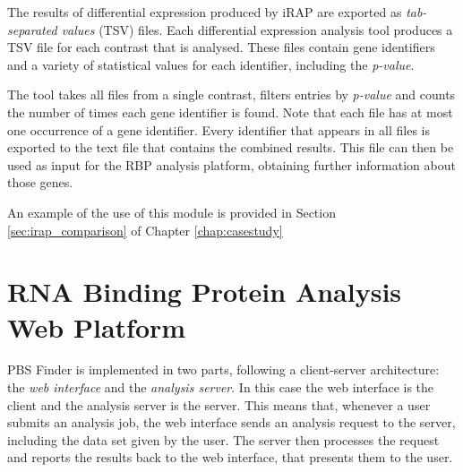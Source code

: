 The results of differential expression produced by iRAP are exported as
\emph{tab-separated values} (TSV) files. Each differential expression analysis
tool produces a TSV file for each contrast that is analysed. These files contain
gene identifiers and a variety of statistical values for each identifier,
including the \emph{p-value}.

The tool takes all files from a single contrast, filters entries by
\emph{p-value} and counts the number of times each gene identifier is found.
Note that each file has at most one occurrence of a gene identifier. Every
identifier that appears in all files is exported to the text file that contains
the combined results. This file can then be used as input for the RBP analysis
platform, obtaining further information about those genes.

An example of the use of this module is provided in Section
\ref{sec:irap_comparison} of Chapter \ref{chap:casestudy}

\section{RNA Binding Protein Analysis Web Platform}



PBS Finder is implemented in two parts, following a client-server architecture:
the \emph{web interface} and the \emph{analysis server}. In this case the web
interface is the client and the analysis server is the server. This means that,
whenever a user submits an analysis job, the web interface sends an analysis
request to the server, including the data set given by the user. The server then
processes the request and reports the results back to the web interface, that
presents them to the user.


